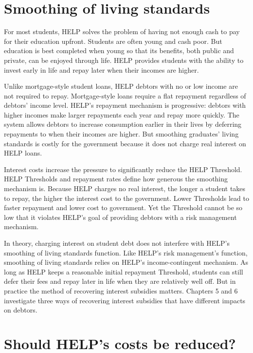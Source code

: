 \documentclass[embargoed]{grattan}
\begin{document}
\section{Smoothing of living standards}\label{smoothing-of-living-standards}

For most students, \gls{HELP} solves the problem of having not enough cash to pay for their education upfront.
Students are often young and cash poor.
But education is best completed when young so that its benefits, both public and private, can be enjoyed through life.
\gls{HELP} provides students with the ability to invest early in life and repay later when their incomes are higher.

Unlike mortgage-style student loans, \gls{HELP} debtors with no or low income are not required to repay.
Mortgage-style loans require a flat repayment regardless of debtors' income level.
\gls{HELP}'s repayment mechanism is progressive: debtors with higher incomes make larger repayments each year and repay more quickly.
The system allows debtors to increase consumption earlier in their lives by deferring repayments to when their incomes are higher.
But smoothing graduates' living standards is costly for the government because it does not charge real interest on \gls{HELP} loans.

Interest costs increase the pressure to significantly reduce the \gls{HELP} \gls{Threshold}.
\gls{HELP} \gls{Threshold}s and repayment rates define how generous the smoothing mechanism is.
Because \gls{HELP} charges no real interest, the longer a student takes to repay, the higher the interest cost to the government.
Lower \gls{Threshold}s lead to faster repayment and lower cost to government.
Yet the \gls{Threshold} cannot be so low that it violates \gls{HELP}'s goal of providing debtors with a risk management mechanism.

In theory, charging interest on student debt does not interfere with \gls{HELP}'s smoothing of living standards function.
Like \gls{HELP}'s risk management's function, smoothing of living standards relies on \gls{HELP}'s income-contingent mechanism.
As long as \gls{HELP} keeps a reasonable initial repayment \gls{Threshold}, students can still defer their fees and repay later in life when they are relatively well off. \protect\hypertarget{_Ref435627338}{}{}But in practice the method of recovering interest subsidies matters.
Chapters 5 and 6 investigate three ways of recovering interest subsidies that have different impacts on debtors.

\section[Should {HELP}'s costs be reduced?]{Should \gls{HELP}'s costs be reduced?}\label{should-helps-costs-be-reduced}
\end{document}
